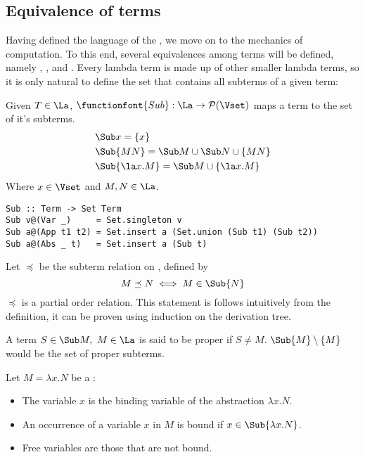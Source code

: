 \subsection{\centering Equivalence of terms}
Having defined the language of the \lcalc, we move on to the mechanics of computation. To this end, several equivalences among terms will be defined, namely \aequiv, \bequiv, and \etaequiv
. Every lambda term is made up of other smaller lambda terms, so it is only natural to define the set that contains all subterms of a given term:
\begin{definition} Given $T \in \La$, $\functionfont{Sub} : \La \to \mathcal{P}(\Vset)$ maps a term to the set of it's subterms.
  \begin{align*}
    &\Sub x = \{x\} \\
    &\Sub {MN} = \Sub M  \cup \Sub N \cup \{MN\} \\
    &\Sub {\la x . M} = \Sub M  \cup \{\la x. M\}
  \end{align*}
  Where $x \in \Vset$ and $M, N \in \La $.
  \begin{lstlisting}[style=haskellstyle,caption={Haskell implementation of Sub.}]
Sub :: Term -> Set Term
Sub v@(Var _)     = Set.singleton v
Sub a@(App t1 t2) = Set.insert a (Set.union (Sub t1) (Sub t2))
Sub a@(Abs _ t)   = Set.insert a (Sub t)
  \end{lstlisting}
\end{definition}
\begin{remark}
  Let \( \preceq \) be the subterm relation on \lterms, defined by
  \[
    M \preceq N \iff M \in \Sub{ N }
  \]
  \( \preceq \) is a partial order relation. This statement is follows intuitively from the definition, it can be proven using induction on the derivation tree.
\end{remark}
\begin{definition} A term $ S \in \Sub M, \ M \in \La$ is said to be proper if $S \neq M$. $\Sub{M} \setminus \{M\}$ would be the set of proper subterms.
\end{definition}
\begin{definition} Let \( M = \lambda x. N \) be a \lterm:
  \begin{itemize}
  \item The variable \( x \) is the binding variable of the abstraction \( \lambda x. N \).
  \item An occurrence of a variable \( x \) in \( M \) is bound if \( x \in \Sub { \lambda x. N } \).
  \item Free variables are those that are not bound.
  \end{itemize}
\end{definition}
